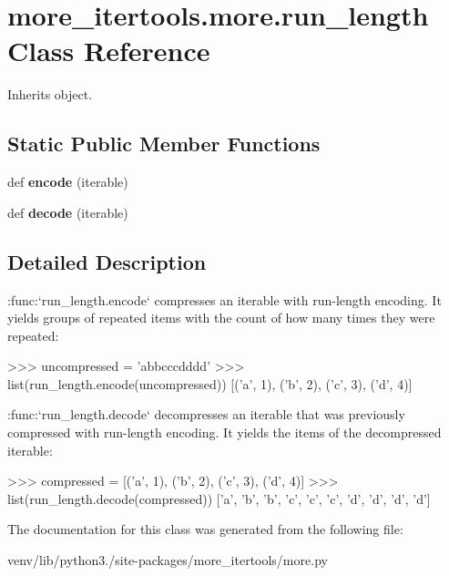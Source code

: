 \hypertarget{classmore__itertools_1_1more_1_1run__length}{}\section{more\+\_\+itertools.\+more.\+run\+\_\+length Class Reference}
\label{classmore__itertools_1_1more_1_1run__length}


Inherits object.

\subsection*{Static Public Member Functions}
\begin{DoxyCompactItemize}
\item 
\mbox{\label{classmore__itertools_1_1more_1_1run__length_afc6ac8a0ede2ea473548e94627e82c0d}} 
def {\bfseries encode} (iterable)
\item 
\mbox{\label{classmore__itertools_1_1more_1_1run__length_ad02295e21bbdc2b29dfb7e8b21470ba5}} 
def {\bfseries decode} (iterable)
\end{DoxyCompactItemize}


\subsection{Detailed Description}
\begin{DoxyVerb}:func:`run_length.encode` compresses an iterable with run-length encoding.
It yields groups of repeated items with the count of how many times they
were repeated:

    >>> uncompressed = 'abbcccdddd'
    >>> list(run_length.encode(uncompressed))
    [('a', 1), ('b', 2), ('c', 3), ('d', 4)]

:func:`run_length.decode` decompresses an iterable that was previously
compressed with run-length encoding. It yields the items of the
decompressed iterable:

    >>> compressed = [('a', 1), ('b', 2), ('c', 3), ('d', 4)]
    >>> list(run_length.decode(compressed))
    ['a', 'b', 'b', 'c', 'c', 'c', 'd', 'd', 'd', 'd']\end{DoxyVerb}
 

The documentation for this class was generated from the following file\+:\begin{DoxyCompactItemize}
\item 
venv/lib/python3./site-\/packages/more\+\_\+itertools/more.\+py\end{DoxyCompactItemize}
